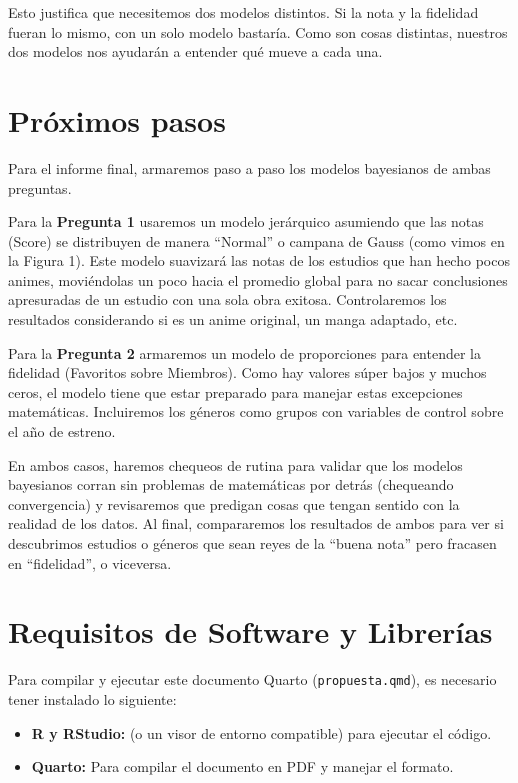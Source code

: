 \documentclass[
  spanish,
  11pt,
  letterpaper,
]{article}
\providecommand{\tightlist}{%
  \setlength{\itemsep}{0pt}\setlength{\parskip}{0pt}}
\begin{document}
Esto justifica que necesitemos dos modelos distintos. Si la nota y la
fidelidad fueran lo mismo, con un solo modelo bastaría. Como son cosas
distintas, nuestros dos modelos nos ayudarán a entender qué mueve a cada
una.

\section{Próximos pasos}\label{pruxf3ximos-pasos}

Para el informe final, armaremos paso a paso los modelos bayesianos de
ambas preguntas.

Para la \textbf{Pregunta 1} usaremos un modelo jerárquico asumiendo que
las notas (Score) se distribuyen de manera ``Normal'' o campana de Gauss
(como vimos en la Figura 1). Este modelo suavizará las notas de los
estudios que han hecho pocos animes, moviéndolas un poco hacia el
promedio global para no sacar conclusiones apresuradas de un estudio con
una sola obra exitosa. Controlaremos los resultados considerando si es
un anime original, un manga adaptado, etc.

Para la \textbf{Pregunta 2} armaremos un modelo de proporciones para
entender la fidelidad (Favoritos sobre Miembros). Como hay valores súper
bajos y muchos ceros, el modelo tiene que estar preparado para manejar
estas excepciones matemáticas. Incluiremos los géneros como grupos con
variables de control sobre el año de estreno.

En ambos casos, haremos chequeos de rutina para validar que los modelos
bayesianos corran sin problemas de matemáticas por detrás (chequeando
convergencia) y revisaremos que predigan cosas que tengan sentido con la
realidad de los datos. Al final, compararemos los resultados de ambos
para ver si descubrimos estudios o géneros que sean reyes de la ``buena
nota'' pero fracasen en ``fidelidad'', o viceversa.

\section{Requisitos de Software y
Librerías}\label{requisitos-de-software-y-libreruxedas}

Para compilar y ejecutar este documento Quarto (\texttt{propuesta.qmd}),
es necesario tener instalado lo siguiente:

\begin{itemize}
\tightlist
\item
  \textbf{R y RStudio:} (o un visor de entorno compatible) para ejecutar
  el código.
\item
  \textbf{Quarto:} Para compilar el documento en PDF y manejar el
  formato.
\end{itemize}
\end{document}
